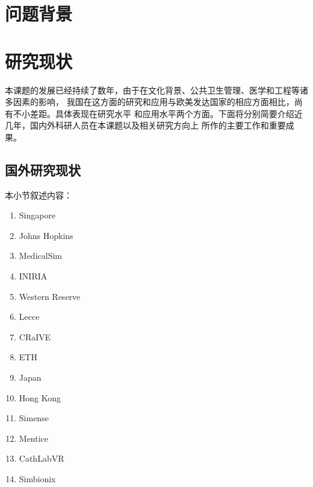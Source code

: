 \section{问题背景}


\section{研究现状}


本课题的发展已经持续了数年，由于在文化背景、公共卫生管理、医学和工程等诸多因素的影响，
我国在这方面的研究和应用与欧美发达国家的相应方面相比，尚有不小差距。具体表现在研究水平
和应用水平两个方面。下面将分别简要介绍近几年，国内外科研人员在本课题以及相关研究方向上
所作的主要工作和重要成果。

\subsection{国外研究现状}

本小节叙述内容：
\begin{enumerate}
  \item Singapore
  \item Johns Hopkins
  \item MedicalSim
  \item INIRIA
  \item Western Reserve
  \item Lecce
  \item CRaIVE
  \item ETH
  \item Japan
  \item Hong Kong
  \item Simense
  \item Mentice
  \item CathLabVR
  \item Simbionix
\end{enumerate}

